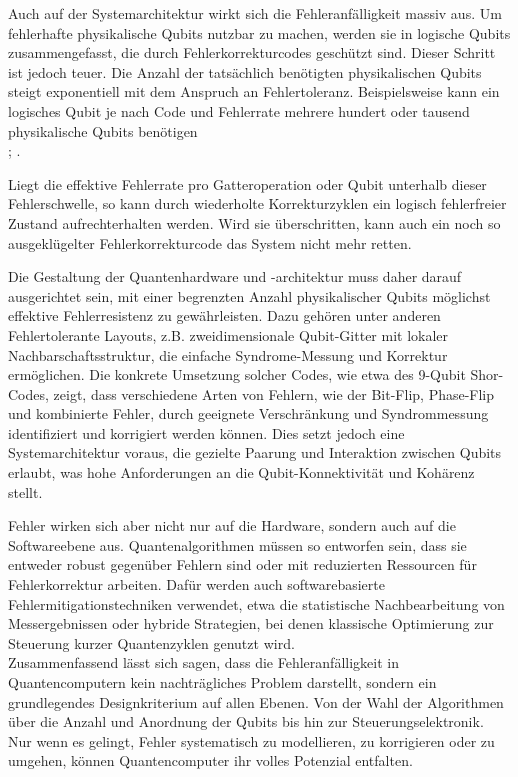Auch auf der Systemarchitektur wirkt sich die Fehleranfälligkeit massiv aus. Um fehlerhafte physikalische Qubits nutzbar zu machen, werden sie in logische Qubits zusammengefasst, die durch Fehlerkorrekturcodes geschützt sind. Dieser Schritt ist jedoch teuer. Die Anzahl der tatsächlich benötigten physikalischen Qubits steigt exponentiell mit dem Anspruch an Fehlertoleranz. Beispielsweise kann ein logisches Qubit je nach Code und Fehlerrate mehrere hundert oder tausend physikalische Qubits benötigen \cite[Seite 435–437]{nielsen_quantum_2010}\\; \cite[Seite 246-253]{rieffel_eleanor_g_and_wolfgang_h_polak_quantum_2011}.

Liegt die effektive Fehlerrate pro Gatteroperation oder Qubit unterhalb dieser Fehlerschwelle, so kann durch wiederholte Korrekturzyklen ein logisch fehlerfreier Zustand aufrechterhalten werden. Wird sie überschritten, kann auch ein noch so ausgeklügelter Fehlerkorrekturcode das System nicht mehr retten.

Die Gestaltung der Quantenhardware und -architektur muss daher darauf ausgerichtet sein, mit einer begrenzten Anzahl physikalischer Qubits möglichst effektive Fehlerresistenz zu gewährleisten. Dazu gehören unter anderen Fehlertolerante Layouts, z.B. zweidimensionale Qubit-Gitter mit lokaler Nachbarschaftsstruktur, die einfache Syndrome-Messung und Korrektur ermöglichen.
Die konkrete Umsetzung solcher Codes, wie etwa des 9-Qubit Shor-Codes, zeigt, dass verschiedene Arten von Fehlern, wie der Bit-Flip, Phase-Flip und kombinierte Fehler, durch geeignete Verschränkung und Syndrommessung identifiziert und korrigiert werden können. Dies setzt jedoch eine Systemarchitektur voraus, die gezielte Paarung und Interaktion zwischen Qubits erlaubt, was hohe Anforderungen an die Qubit-Konnektivität und Kohärenz stellt.

Fehler wirken sich aber nicht nur auf die Hardware, sondern auch auf die Softwareebene aus. Quantenalgorithmen müssen so entworfen sein, dass sie entweder robust gegenüber Fehlern sind oder mit reduzierten Ressourcen für Fehlerkorrektur arbeiten. Dafür werden auch softwarebasierte Fehlermitigationstechniken verwendet, etwa die statistische Nachbearbeitung von Messergebnissen oder hybride Strategien, bei denen klassische Optimierung zur Steuerung kurzer Quantenzyklen genutzt wird. \cite[Seite 305-306]{rieffel_eleanor_g_and_wolfgang_h_polak_quantum_2011}\\

Zusammenfassend lässt sich sagen, dass die Fehleranfälligkeit in Quantencomputern kein nachträgliches Problem darstellt, sondern ein grundlegendes Designkriterium auf allen Ebenen. Von der Wahl der Algorithmen über die Anzahl und Anordnung der Qubits bis hin zur Steuerungselektronik. Nur wenn es gelingt, Fehler systematisch zu modellieren, zu korrigieren oder zu umgehen, können Quantencomputer ihr volles Potenzial entfalten.


